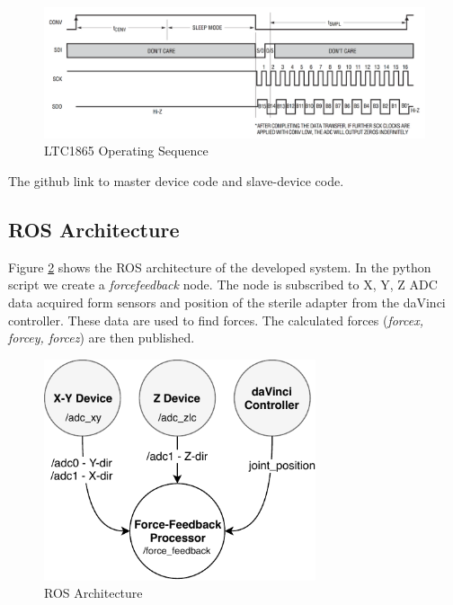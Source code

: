\begin{figure}[h]
	\begin{center}
		\includegraphics[width=140mm]{fig/methods/SPI_communication.png}
	\end{center}
	\vspace{-4mm}
	\caption[ADC LTC1865 Operating Sequence]
	{LTC1865 Operating Sequence \cite{ltc1865}}
	\label{fig:SPI_com}
	\vspace{-2mm}
\end{figure}

The github link to master device code and slave-device code.

	\subsection{ROS Architecture}
	\label{sec:p2}
Figure \ref{fig:ROS_arch} shows the ROS architecture of the developed system. In the python script we create a \textit{force\textunderscore feedback} node. The node is subscribed to X, Y, Z ADC data acquired form sensors and position of the sterile adapter from the daVinci controller. These data are used to find forces. The calculated forces (\textit{force\textunderscore x, force\textunderscore y, force\textunderscore z}) are then published.
\begin{figure}[h]
	\begin{center}
		\includegraphics[width=80mm]{fig/methods/ROS_architecture.pdf}
	\end{center}
	\vspace{-4mm}
	\caption[ROS architecture]
	{ROS Architecture}
	\label{fig:ROS_arch}
	\vspace{-2mm}
\end{figure}	


